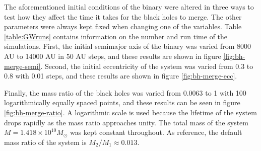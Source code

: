 \documentclass[english, oneside]{HYgradu}
\begin{document}
The aforementioned initial conditions of the binary were altered in three ways to test how they affect the time it takes for the black holes to merge. The other parameters were always kept fixed when changing one of the variables. Table \ref{table:GWruns} contains information on the number and run time of the simulations. First, the initial semimajor axis of the binary was varied from 8000 AU to 14000 AU in 50 AU steps, and these results are shown in figure \ref{fig:bh-merge-semi}.
Second, the initial eccentricity of the system was varied from 0.3 to 0.8 with 0.01 steps, and these results are shown in figure \ref{fig:bh-merge-ecc}.

Finally, the mass ratio of the black holes was varied from 0.0063 to 1 with 100 logarithmically equally spaced points, and these results can be seen in figure \ref{fig:bh-merge-ratio}. A logarithmic scale is used because the lifetime of the system drops rapidly as the mass ratio approaches unity. The total mass of the system $M = 1.418 \times 10^{10} M_{\odot}$ was kept constant throughout. As reference, the default mass ratio of the system is $M_2/M_1 \approx 0.013$.
\end{document}
